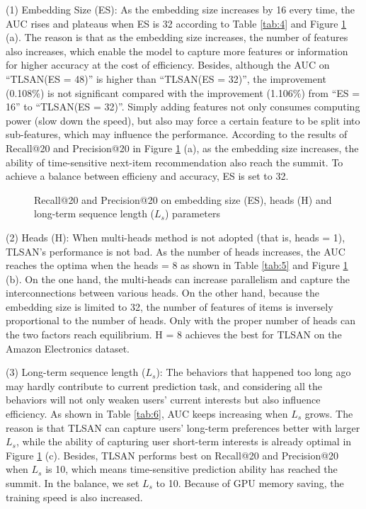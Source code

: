 \documentclass[preprint,12pt]{elsarticle}
\newcommand{\tool}{TLSAN\xspace}
\begin{document}
\begin{sloppypar}
(1) Embedding Size (ES): As the embedding size increases by 16 every time, the AUC rises and plateaus when ES is 32 according to Table \ref{tab:4} and Figure \ref{fig:6} (a). The reason is that as the embedding size increases, the number of features also increases, which enable the model to capture more features or information for higher accuracy at the cost of efficiency. Besides, although the AUC on ``\tool (ES = 48)'' is higher than ``\tool (ES = 32)'', the improvement (0.108\%) is not significant compared with the improvement (1.106\%) from ``ES = 16'' to ``\tool (ES = 32)''. Simply adding features not only consumes computing power (slow down the speed), but also may force a certain feature to be split into sub-features, which may influence the performance. According to the results of Recall@20 and Precision@20 in Figure \ref{fig:6} (a), as the embedding size increases, the ability of time-sensitive next-item recommendation also reach the summit. To achieve a balance between efficieny and accuracy, ES is set to 32.

\begin{figure}
	\centering
	\caption{Recall@20 and Precision@20 on embedding size (ES), heads (H) and long-term sequence length ($L_s$) parameters}\label{fig:6}
\end{figure}

(2) Heads (H): When multi-heads method is not adopted (that is, heads = 1), \tool's performance is not bad. As the number of heads increases, the AUC reaches the optima when the heads = 8 as shown in Table \ref{tab:5} and Figure \ref{fig:6} (b). On the one hand, the multi-heads can increase parallelism and capture the interconnections between various heads. On the other hand, because the embedding size is limited to 32, the number of features of items is inversely proportional to the number of heads. Only with the proper number of heads can the two factors reach equilibrium. H = 8 achieves the best for \tool on the Amazon Electronics dataset.

(3) Long-term sequence length ($L_s$): The behaviors that happened too long ago may hardly contribute to current prediction task, and considering all the behaviors will not only weaken users' current interests but also influence efficiency. As shown in Table \ref{tab:6}, AUC keeps increasing when $L_s$ grows. The reason is that \tool can capture users' long-term preferences better with larger $L_s$, while the ability of capturing user short-term interests is already optimal in Figure \ref{fig:6} (c). Besides, \tool performs best on Recall@20 and Precision@20 when $L_s$ is 10, which means time-sensitive prediction ability has reached the summit. In the balance, we set $L_s$ to 10. Because of GPU memory saving, the training speed is also increased.


\end{sloppypar}
\end{document}

